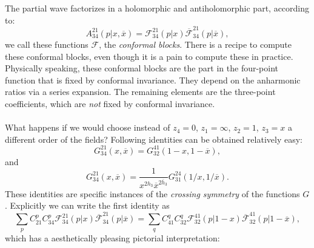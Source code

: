 \documentclass[submission, PhysLectNotes]{SciPost}
\begin{document}
The partial wave factorizes in a holomorphic and antiholomorphic part, according to:
\begin{equation}
	A_{34}^{21}(p|x,\overline{x}) = \mathcal{F}_{34}^{21}(p|x)\overline{\mathcal{F}}_{34}^{21}(p|\overline{x}),
\end{equation}
we call these functions $\mathcal{F}$, the \emph{conformal blocks}. There is a recipe to compute these conformal blocks, even though it is a pain to compute these in practice. Physically speaking, these conformal blocks are the part in the four-point function that is fixed by conformal invariance. They depend on the anharmonic ratios via a series expansion. The remaining elements are the three-point coefficients, which are \emph{not} fixed by conformal invariance. \\

 \\
What happens if we would choose instead of $z_4 = 0$, $z_1 = \infty$, $z_2 = 1$, $z_3 = x$ a different order of the fields? Following identities can be obtained relatively easy:
\begin{equation}
	G_{34}^{21}(x,\overline{x}) = G_{32}^{41}(1-x,1-\overline{x}),
\end{equation}
and
\begin{equation}
	G_{34}^{21}(x,\overline{x}) = \frac{1}{x^{2h_3}\overline{x}^{2\overline{h}_3}}G_{31}^{24}(1/x,1/\overline{x}).
\end{equation}
These identities are specific instances of the \emph{crossing symmetry} of the functions $G$. Explicitly we can write the first identity as
\begin{equation}
	\sum_p C_{21}^p C_{34}^p\mathcal{F}_{34}^{21}(p|x)\overline{\mathcal{F}}_{34}^{21}(p|\overline{x}) = \sum_q C_{41}^q C_{32}^q \mathcal{F}_{32}^{41}(p|1-x)\overline{\mathcal{F}}_{32}^{41}(p|1-\overline{x}),
\end{equation}
which has a aesthetically pleasing pictorial interpretation:
\begin{figure}
\centering
{}
\end{figure}
\end{document}
